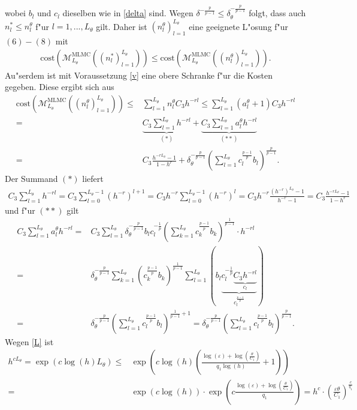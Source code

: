 wobei $b_l$ und $c_l$ dieselben wie in \eqref{delta} sind. Wegen $\delta^{-\frac{p}{p-1}}\leq \delta_\theta^{-\frac{p}{p-1}}$ folgt, dass auch $n_l^*\leq n_l^\theta$ f"ur $l=1,...,L_\theta$ gilt. Daher ist $(n_l^\theta)_{l=1}^{L_\theta}$ eine geeignete L"osung f"ur $(6)-(8)$ mit 
\begin{align*}
\text{cost}(\mathcal{M}_{L_\theta}^{\text{MLMC}}((n_l^*)_{l=1}^{L_\theta}))\leq \text{cost}(\mathcal{M}_{L_\theta}^{\text{MLMC}}((n_l^\theta)_{l=1}^{L_\theta})).
\end{align*}
Au"serdem ist mit Voraussetzung \ref{v} eine obere Schranke f"ur die Kosten gegeben. Diese ergibt sich aus
\begin{align}\label{r}
\text{cost}(\mathcal{M}_{L_\theta}^{\text{MLMC}}((n_l^\theta)_{l=1}^{L_\theta}))
\leq& \nonumber \sum_{l=1}^{L_\theta}n_l^\theta C_3h^{-rl}\leq \sum_{l=1}^{L_\theta}(a_l^\theta+1)C_3h^{-rl}\\ \nonumber=&
\underbrace{C_3\sum_{l=1}^{L_\theta}h^{-rl}}_{(*)}+\underbrace{C_3\sum_{l=1}^{L_\theta}a_l^\theta h^{-rl}}_{(**)}
\\=&C_3\frac{h^{-rL_\theta}-1}{1-h^r}+\delta_\theta^{-\frac{p}{p-1}}\left(\sum_{l=1}^{L_\theta}c_l^{\frac{p-1}{p}}b_l\right)^{\frac{p}{p-1}}.
\end{align}
Der Summand $(*)$ liefert
\begin{align*}
C_3\sum_{l=1}^{L_\theta}h^{-rl}=C_3\sum_{l=0}^{L_\theta-1}(h^{-r})^{l+1}=C_3h^{-r} \sum_{l=0}^{L_\theta-1}(h^{-r})^{l}=C_3h^{-r}\frac{(h^{-r})^{L_\theta}-1}{h^{-r}-1}=C_3\frac{h^{-rL_\theta}-1}{1-h^r}
\end{align*}
und f"ur  $(**)$ gilt
\begin{align*}
C_3\sum_{l=1}^{L_\theta}a_l^\theta h^{-rl}=&C_3\sum_{l=1}^{L_\theta}\delta_\theta^{-\frac{p}{p-1}}b_lc_l^{-\frac{1}{p}}\left(\sum_{k=1}^{L_\theta}c_k^{\frac{p-1}{p}}b_k\right)^{\frac{1}{p-1}}\cdot h^{-rl}
\\=&\delta_\theta^{-\frac{p}{p-1}}\sum_{k=1}^{L_\theta}\left(c_k^{\frac{p-1}{p}}b_k\right)^{\frac{1}{p-1}}\sum_{l=1}^{L_\theta}(b_l\underbrace{c_l^{-\frac{1}{p}}\underbrace{C_3h^{-rl}}_{c_l}}_{c_l^{\frac{p-1}{p}}})\\
=&\delta_\theta^{-\frac{p}{p-1}}\left(\sum_{l=1}^{L_\theta}c_l^{\frac{p-1}{p}}b_l\right)^{\frac{1}{p-1}+1}=\delta_\theta^{-\frac{p}{p-1}}\left(\sum_{l=1}^{L_\theta}c_l^{\frac{p-1}{p}}b_l\right)^{\frac{p}{p-1}}.
\end{align*}
Wegen \eqref{L} ist
\begin{align*}
h^{cL_\theta}=\exp(c\log(h)L_\theta)\leq&\exp\left(c\log(h)\left(\frac{\log(\varepsilon)+\log(\frac{\theta}{C_1})}{q_1\log(h)}+1\right)\right)\\
=&\exp(c\log(h))\cdot\exp\left(c\frac{\log(\varepsilon)+\log(\frac{\theta}{C_1})}{q_1}\right)=h^c\cdot\left(\frac{\varepsilon\theta}{C_1}\right)^{\frac{c}{q_1}}
\end{align*}
